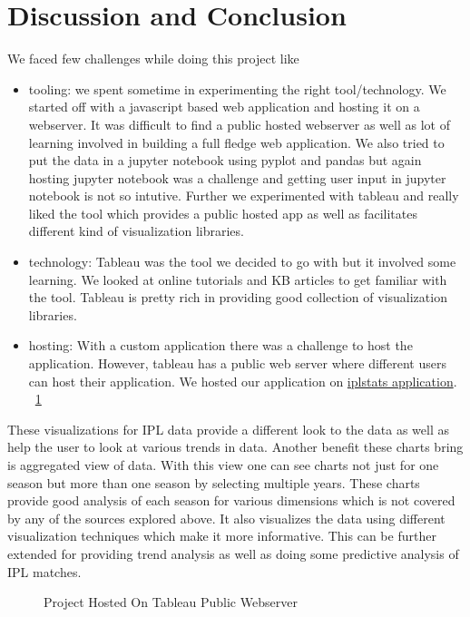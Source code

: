 \documentclass[sigconf]{acmart}
\begin{document}
\section{Discussion and Conclusion}
We faced few challenges while doing this project like
\begin{itemize}
\item tooling: we spent sometime in experimenting the right tool/technology.
We started off with a javascript based web application and hosting
it on a webserver. It was difficult to find a public hosted webserver as 
well as lot of learning involved in building a full fledge web application.
We also tried to put the data in a jupyter notebook using pyplot and pandas
but again hosting jupyter notebook was a challenge and getting user input in jupyter
notebook is not so intutive. Further we experimented with tableau and really
liked the tool which provides a public hosted app as well as facilitates different kind
of visualization libraries.
\item technology: Tableau \cite{www-tableau} was the tool we decided to go with but it involved some learning.
We looked at online tutorials and KB articles to get familiar with the tool. Tableau is pretty
rich in providing good collection of visualization libraries. 
\item hosting: With a custom application there was a challenge to 
host the application. However, tableau has a public web server
where different users can host their application. We hosted our application on 
\href{https://us-west-2b.online.tableau.com/#/site/summer2018dviz/views }{iplstats application}. ~\ref{fig:tableau_webserver}
\end{itemize} 
These visualizations for IPL data provide a different look to the data as well
as help the user to look at various trends in data. 
Another benefit these charts bring is aggregated view of data. With this view
one can see charts not just for one season but more than one season by selecting multiple
years. These charts provide good analysis of each season for various dimensions which is not covered 
by any of the sources explored above. It also visualizes the data using different visualization techniques
which make it more informative. This can be further extended  for providing trend analysis as well as doing 
some predictive analysis of IPL matches.

\begin{figure}[htbp]
\centering
{}
\caption{Project Hosted On Tableau Public Webserver}
\label{fig:tableau_webserver}
\end{figure}
\end{document}
